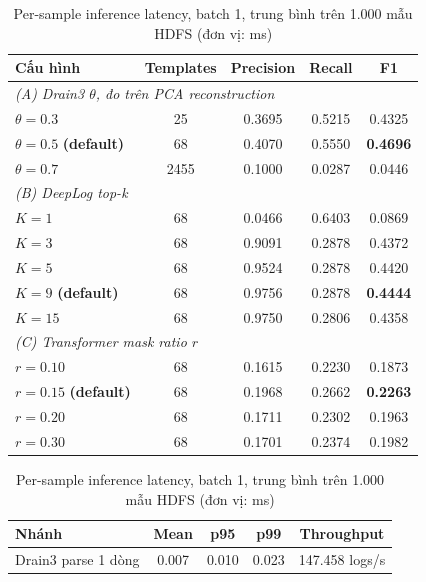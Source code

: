 \documentclass[conference]{IEEEtran}
\begin{document}
\begin{table}[!t]
\begin{minipage}[t]{0.48\textwidth}
\caption{Ablation siêu tham số trên HDFS 200k (seed 42)}
\begin{center}
\scriptsize
\setlength{\tabcolsep}{3pt}
\begin{tabular}{lcccc}
\toprule
\textbf{Cấu hình} & \textbf{Templates} & \textbf{Precision} & \textbf{Recall} & \textbf{F1} \\
\midrule
\multicolumn{5}{l}{\textit{(A) Drain3 $\theta$, đo trên PCA reconstruction}} \\
$\theta=0.3$ & 25 & 0.3695 & 0.5215 & 0.4325 \\
$\theta=0.5$ \textbf{(default)} & 68 & 0.4070 & 0.5550 & \textbf{0.4696} \\
$\theta=0.7$ & 2455 & 0.1000 & 0.0287 & 0.0446 \\
\midrule
\multicolumn{5}{l}{\textit{(B) DeepLog top-k}} \\
$K=1$ & 68 & 0.0466 & 0.6403 & 0.0869 \\
$K=3$ & 68 & 0.9091 & 0.2878 & 0.4372 \\
$K=5$ & 68 & 0.9524 & 0.2878 & 0.4420 \\
$K=9$ \textbf{(default)} & 68 & 0.9756 & 0.2878 & \textbf{0.4444} \\
$K=15$ & 68 & 0.9750 & 0.2806 & 0.4358 \\
\midrule
\multicolumn{5}{l}{\textit{(C) Transformer mask ratio $r$}} \\
$r=0.10$ & 68 & 0.1615 & 0.2230 & 0.1873 \\
$r=0.15$ \textbf{(default)} & 68 & 0.1968 & 0.2662 & \textbf{0.2263} \\
$r=0.20$ & 68 & 0.1711 & 0.2302 & 0.1963 \\
$r=0.30$ & 68 & 0.1701 & 0.2374 & 0.1982 \\
\bottomrule
\end{tabular}
\label{tab_ablation}
\end{center}
\end{minipage}
\hfill
\begin{minipage}[t]{0.48\textwidth}
\caption{Per-sample inference latency, batch 1, trung bình trên 1.000 mẫu HDFS (đơn vị: ms)}
\begin{center}
\scriptsize
\setlength{\tabcolsep}{3pt}
\begin{tabular}{lcccc}
\toprule
\textbf{Nhánh} & \textbf{Mean} & \textbf{p95} & \textbf{p99} & \textbf{Throughput} \\
\midrule
Drain3 parse 1 dòng & 0.007 & 0.010 & 0.023 & 147.458 logs/s \\

\end{tabular}
\end{center}
\end{minipage}
\end{table}
\end{document}
